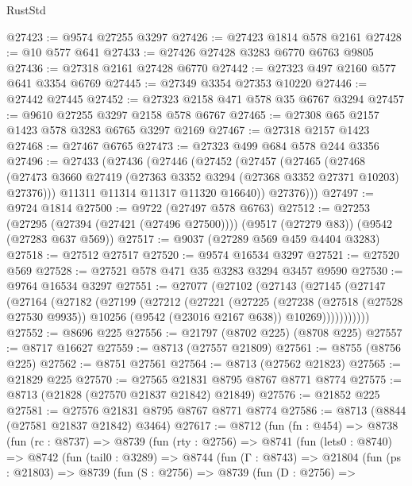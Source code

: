 \begin{lexlean}{RustStd}
\begin{coremodule}
@27423 := @9574 @27255 @3297
@27426 := @27423 @1814 @578 @2161
@27428 := @10 @577 @641
@27433 := @27426 @27428 @3283 @6770 @6763 @9805
@27436 := @27318 @2161 @27428 @6770
@27442 := @27323 @497 @2160 @577 @641 @3354 @6769
@27445 := @27349 @3354 @27353 @10220
@27446 := @27442 @27445
@27452 := @27323 @2158 @471 @578 @35 @6767 @3294
@27457 := @9610 @27255 @3297 @2158 @578 @6767
@27465 := @27308 @65 @2157 @1423 @578 @3283 @6765 @3297 @2169
@27467 := @27318 @2157 @1423
@27468 := @27467 @6765
@27473 := @27323 @499 @684 @578 @244 @3356
@27496 := @27433
    (@27436
      (@27446
        (@27452
          (@27457
            (@27465
              (@27468
                (@27473 @3660 @27419 (@27363 @3352 @3294 (@27368 @3352 @27371 @10203) @27376)))
              @11311
              @11314
              @11317
              @11320
              @16640))
          @27376)))
@27497 := @9724 @1814
@27500 := @9722 (@27497 @578 @6763)
@27512 := @27253
    (@27295 (@27394 (@27421 (@27496 @27500))))
    (@9517 (@27279 @83))
    (@9542 (@27283 @637 @569))
@27517 := @9037 (@27289 @569 @459 @4404 @3283)
@27518 := @27512 @27517
@27520 := @9574 @16534 @3297
@27521 := @27520 @569
@27528 := @27521 @578 @471 @35 @3283 @3294 @3457 @9590
@27530 := @9764 @16534 @3297
@27551 := @27077
    (@27102
      (@27143
        (@27145
          (@27147
            (@27164
              (@27182
                (@27199
                  (@27212
                    (@27221
                      (@27225
                        (@27238
                          (@27518 (@27528 @27530 @9935))
                          @10256
                          (@9542 (@23016 @2167 @638))
                          @10269)))))))))))
@27552 := @8696 @225
@27556 := @21797 (@8702 @225) (@8708 @225)
@27557 := @8717 @16627
@27559 := @8713 (@27557 @21809)
@27561 := @8755 (@8756 @225)
@27562 := @8751 @27561
@27564 := @8713 (@27562 @21823)
@27565 := @21829 @225
@27570 := @27565 @21831 @8795 @8767 @8771 @8774
@27575 := @8713 (@21828 (@27570 @21837 @21842) @21849)
@27576 := @21852 @225
@27581 := @27576 @21831 @8795 @8767 @8771 @8774
@27586 := @8713 (@8844 (@27581 @21837 @21842) @3464)
@27617 := @8712
    (fun (fn : @454) =>
    @8738
      (fun (rc : @8737) =>
      @8739
        (fun (rty : @2756) =>
        @8741
          (fun (lets0 : @8740) =>
          @8742
            (fun (tail0 : @3289) =>
            @8744
              (fun (Γ : @8743) =>
              @21804
                (fun (ps : @21803) =>
                @8739
                  (fun (S : @2756) =>
                  @8739
                    (fun (D : @2756) =>

\end{coremodule}
\end{lexlean}
